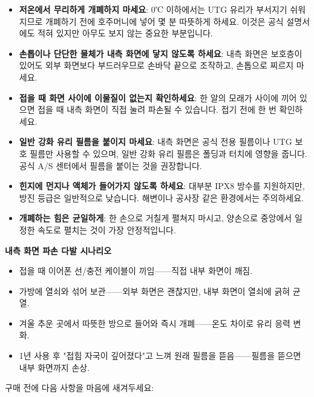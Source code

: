 \begin{itemize}
  \item \textbf{저온에서 무리하게 개폐하지 마세요}: 0℃ 이하에서는 UTG 유리가 부서지기 쉬워지므로 개폐하기 전에 호주머니에 넣어 몇 분 따뜻하게 하세요. 이것은 공식 설명서에도 적혀 있지만 아무도 보지 않는 중요한 부분입니다.
  \item \textbf{손톱이나 단단한 물체가 내측 화면에 닿지 않도록 하세요}: 내측 화면은 보호층이 있어도 외부 화면보다 부드러우므로 손바닥 끝으로 조작하고, 손톱으로 찌르지 마세요.
  \item \textbf{접을 때 화면 사이에 이물질이 없는지 확인하세요}: 한 알의 모래가 사이에 끼어 있으면 접을 때 내측 화면이 직접 눌려 파손될 수 있습니다. 접기 전에 한 번 확인하세요.
  \item \textbf{일반 강화 유리 필름을 붙이지 마세요}: 내측 화면은 공식 전용 필름이나 UTG 보호 필름만 사용할 수 있으며, 일반 강화 유리 필름은 폴딩과 터치에 영향을 줍니다. 공식 A/S 센터에서 필름을 붙이는 것을 권장합니다.
  \item \textbf{힌지에 먼지나 액체가 들어가지 않도록 하세요}: 대부분 IPX8 방수를 지원하지만, 방진 등급은 일반적으로 낮습니다. 해변이나 공사장 같은 환경에서는 주의하세요.
  \item \textbf{개폐하는 힘은 균일하게}: 한 손으로 거칠게 펼쳐지 마시고, 양손으로 중앙에서 일정한 속도로 펼치는 것이 가장 안정적입니다.
\end{itemize}

\textbf{내측 화면 파손 다발 시나리오}\par

\begin{itemize}
  \item 접을 때 이어폰 선/충전 케이블이 끼임——직접 내부 화면이 깨짐.
  \item 가방에 열쇠와 섞어 보관——외부 화면은 괜찮지만, 내부 화면이 열쇠에 긁혀 균열.
  \item 겨울 추운 곳에서 따뜻한 방으로 들어와 즉시 개폐——온도 차이로 유리 응력 변화.
  \item 1년 사용 후 "접힘 자국이 깊어졌다"고 느껴 원래 필름을 뜯음——필름을 뜯으면 내부 화면까지 손상.
\end{itemize}


구매 전에 다음 사항을 마음에 새겨두세요:

